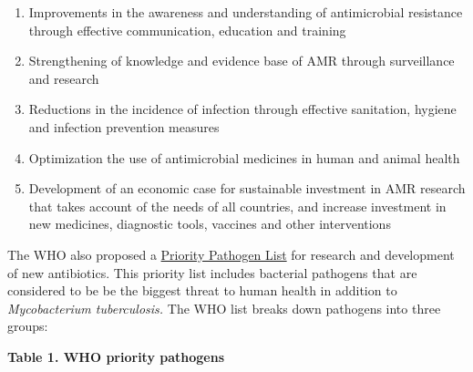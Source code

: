 \documentclass[
]{book}
\providecommand{\tightlist}{%
  \setlength{\itemsep}{0pt}\setlength{\parskip}{0pt}}
\begin{document}
\begin{enumerate}
\def\labelenumi{\arabic{enumi}.}
\tightlist
\item
  Improvements in the awareness and understanding of antimicrobial resistance through effective communication, education and training
\item
  Strengthening of knowledge and evidence base of AMR through surveillance and research
\item
  Reductions in the incidence of infection through effective sanitation, hygiene and infection prevention measures
\item
  Optimization the use of antimicrobial medicines in human and animal health
\item
  Development of an economic case for sustainable investment in AMR research that takes account of the needs of all countries, and increase investment in new medicines, diagnostic tools, vaccines and other interventions
\end{enumerate}

The WHO also proposed a \href{https://www.who.int/medicines/publications/WHO-PPL-Short_Summary_25Feb-ET_NM_WHO.pdf}{Priority Pathogen List} for research and development of new antibiotics. This priority list includes bacterial pathogens that are considered to be be the biggest threat to human health in addition to \emph{Mycobacterium tuberculosis.} The WHO list breaks down pathogens into three groups:

\textbf{Table 1. WHO priority pathogens}
\end{document}

